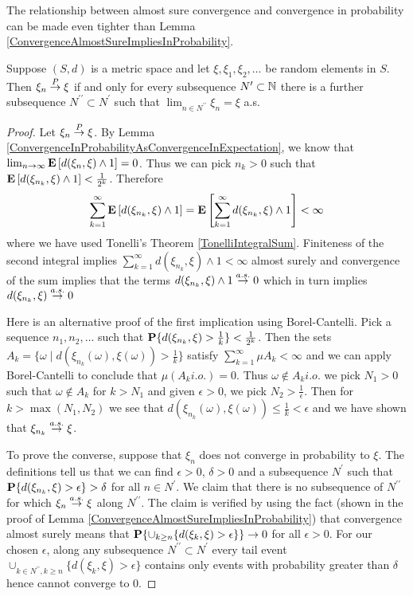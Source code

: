 The relationship between almost sure convergence and convergence in
probability can be made even tighter than Lemma \ref{ConvergenceAlmostSureImpliesInProbability}.
\begin{lem}\label{ConvergenceInProbabilityAlmostSureSubsequence}Suppose $(S,d)$ is a metric space and let $\xi,
  \xi_1, \xi_2, \dots$ be random elements in $S$.  Then $\xi_n \overset{P}\to
  \xi$ if and only for every subsequence $N^\prime \subset \mathbb{N}$ there is a
  further subsequence $N^{\prime\prime} \subset N^\prime$ such that
  $\lim_{n \in N^{\prime\prime}} \xi_n = \xi$ a.s.
\end{lem}
\begin{proof}
Let $\xi_n \overset{P}\to \xi$.  By Lemma
\ref{ConvergenceInProbabilityAsConvergenceInExpectation}, we know that
$\lim_{n \to \infty} \textbf{E}\left[d(\xi_n, \xi) \wedge 1\right]  = 0$.
Thus we can pick $n_k > 0$ such that $\textbf{E}\left[d(\xi_{n_k}, \xi)
  \wedge 1\right] < \frac{1}{2^k}$.  Therefore  
\begin{align*}\sum_{k=1}^\infty \textbf{E}\left[d(\xi_{n_k}, \xi)
  \wedge 1\right] = \textbf{E}\left[\sum_{k=1}^\infty   d(\xi_{n_k}, \xi)
  \wedge 1\right] < \infty
\end{align*} where we have used Tonelli's Theorem
\ref{TonelliIntegralSum}.  Finiteness of the second integral implies $\sum_{k=1}^\infty   d(\xi_{n_k}, \xi)
  \wedge 1 < \infty$ almost surely and convergence of the sum implies
  that the terms $d(\xi_{n_k}, \xi)  \wedge 1 \overset{a.s.}\to 0$ which in turn
  implies  $d(\xi_{n_k}, \xi)  \overset{a.s.}\to 0$

Here is an alternative proof of the first implication using Borel-Cantelli.  Pick a sequence $n_1,
n_2, \dots$ such that $\textbf{P}\{d(\xi_{n_k}, \xi) > \frac{1}{k}\} <
\frac{1}{2^k}$.  Then the sets $A_k=\{\omega \mid d(\xi_{n_k}(\omega),
\xi(\omega)) > \frac{1}{k} \}$ satisfy $\sum_{k=1}^\infty \mu A_k <
\infty$ and we can apply Borel-Cantelli to conclude that $\mu (A_k
i.o.) = 0$.  Thus $\omega \notin A_k
i.o. $ we pick $N_1 > 0$ such that $\omega \notin A_k$ for $k > N_1$
and given $\epsilon >0$, we pick $N_2 >
\frac{1}{\epsilon}$.  Then for $k > \max(N_1,N_2)$ we see that $d(\xi_{n_k}(\omega),
\xi(\omega)) \leq \frac{1}{k} < \epsilon$ and we have shown that $\xi_{n_k} \overset{a.s.}\to \xi$.

To prove the converse, suppose that $\xi_n$ does not converge in
probability to $\xi$.  The definitions tell us that we can find
$\epsilon > 0$, $\delta > 0$ and a subsequence $N^\prime$ such that
$\textbf{P}\{d(\xi_{n_k}, \xi) > \epsilon\} > \delta$ for all $n \in
N^\prime$.  We claim that there is no subsequence of $N^{\prime
  \prime}$ for which $\xi_n \overset{a.s.}\to \xi$ along $N^{\prime \prime}$.  The
claim is verified by using the fact (shown in the proof of Lemma
\ref{ConvergenceAlmostSureImpliesInProbability}) that convergence
almost surely means that $\textbf{P}\{\cup_{k\geq n} \lbrace d(\xi_k,
  \xi) > \epsilon \rbrace\} \to 0$ for all $\epsilon > 0$.  For our
chosen $\epsilon$, along any
subsequence $N^{\prime \prime} \subset N^{\prime}$ every tail event
$\cup_{k \in N^{\prime \prime}, k\geq n} \lbrace d(\xi_k,
  \xi) > \epsilon \rbrace$ contains only events with probability greater
  than $\delta$ hence cannot converge to $0$.
\end{proof}

